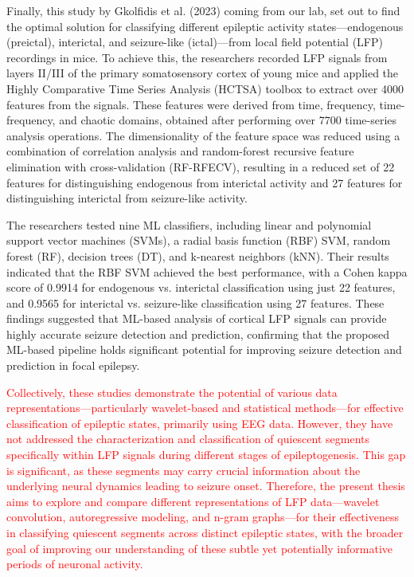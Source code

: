 \documentclass{article}
\begin{document}
Finally, this study \cite{golfidis2023} by Gkolfidis et al. (2023) coming from our lab, set out to find the optimal solution for classifying different epileptic activity states—endogenous (preictal), interictal, and seizure-like (ictal)—from local field potential (LFP) recordings in mice. To achieve this, the researchers recorded LFP signals from layers II/III of the primary somatosensory cortex of young mice and applied the Highly Comparative Time Series Analysis (HCTSA) toolbox to extract over 4000 features from the signals. These features were derived from time, frequency, time-frequency, and chaotic domains, obtained after performing over 7700 time-series analysis operations. The dimensionality of the feature space was reduced using a combination of correlation analysis and random-forest recursive feature elimination with cross-validation (RF-RFECV), resulting in a reduced set of 22 features for distinguishing endogenous from interictal activity and 27 features for distinguishing interictal from seizure-like activity.

The researchers tested nine ML classifiers, including linear and polynomial support vector machines (SVMs), a radial basis function (RBF) SVM, random forest (RF), decision trees (DT), and k-nearest neighbors (kNN). Their results indicated that the RBF SVM achieved the best performance, with a Cohen kappa score of 0.9914 for endogenous vs. interictal classification using just 22 features, and 0.9565 for interictal vs. seizure-like classification using 27 features. These findings suggested that ML-based analysis of cortical LFP signals can provide highly accurate seizure detection and prediction, confirming that the proposed ML-based pipeline holds significant potential for improving seizure detection and prediction in focal epilepsy.

\textcolor{red}{Collectively, these studies demonstrate the potential of various data representations—particularly wavelet-based and statistical methods—for effective classification of epileptic states, primarily using EEG data. However, they have not addressed the characterization and classification of quiescent segments specifically within LFP signals during different stages of epileptogenesis. This gap is significant, as these segments may carry crucial information about the underlying neural dynamics leading to seizure onset. Therefore, the present thesis aims to explore and compare different representations of LFP data—wavelet convolution, autoregressive modeling, and n-gram graphs—for their effectiveness in classifying quiescent segments across distinct epileptic states, with the broader goal of improving our understanding of these subtle yet potentially informative periods of neuronal activity.
}
\end{document}
